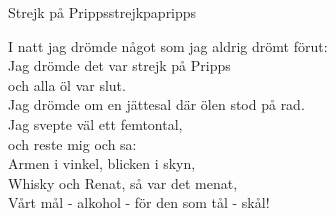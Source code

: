 \begin{song}{Strejk på Pripps}{strejkpapripps}
\begin{vers}
I natt jag drömde något som jag aldrig drömt förut:\\
Jag drömde det var strejk på Pripps\\
och alla öl var slut.\\
Jag drömde om en jättesal där ölen stod på rad.\\
Jag svepte väl ett femtontal,\\
och reste mig och sa:\\
Armen i vinkel, blicken i skyn,\\
Whisky och Renat, så var det menat,\\
Vårt mål - alkohol - för den som tål - skål!\\
\end{vers}
\end{song}
